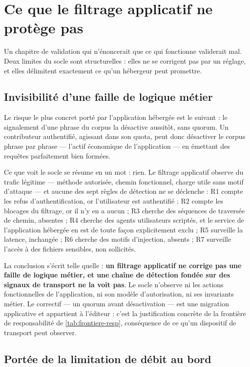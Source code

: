 \section{Ce que le filtrage applicatif ne protège pas}
\label{sec:limites-filtrage}

Un chapitre de validation qui n'énoncerait que ce qui fonctionne validerait mal. Deux limites du
socle sont structurelles : elles ne se corrigent pas par un réglage, et elles délimitent exactement
ce qu'un hébergeur peut promettre.

\subsection{Invisibilité d'une faille de logique métier}

Le risque le plus concret porté par l'application hébergée est le suivant : le signalement d'une
phrase du corpus la désactive aussitôt, sans quorum. Un contributeur authentifié, agissant dans
son quota, peut donc désactiver le corpus phrase par phrase --- l'actif économique de
l'application --- en émettant des requêtes parfaitement bien formées.

Ce que voit le socle se résume en un mot : rien. Le filtrage applicatif observe du trafic
légitime --- méthode autorisée, chemin fonctionnel, charge utile sans motif d'attaque --- et aucune
des sept règles de détection ne se déclenche : R1 compte les refus d'authentification, or l'utilisateur est
authentifié ; R2 compte les blocages du filtrage, or il n'y en a aucun ; R3 cherche des séquences
de traversée de chemin, absentes ; R4 cherche des agents utilisateurs scriptés, et le service de
l'application hébergée en est de toute façon explicitement exclu ; R5 surveille la latence,
inchangée ; R6 cherche des motifs d'injection, absents ; R7 surveille l'accès à des fichiers
sensibles, non sollicités.

La conclusion s'écrit telle quelle : \textbf{un filtrage applicatif ne corrige pas une faille de
logique métier, et une chaîne de détection fondée sur des signaux de transport ne la voit pas}. Le
socle n'observe ni les actions fonctionnelles de l'application, ni son modèle d'autorisation, ni
ses invariants métier. Le correctif --- un quorum avant désactivation --- est une migration
applicative et appartient à l'éditeur : c'est la justification concrète de la frontière de
responsabilité de \cref{tab:frontiere-resp}, conséquence de ce qu'un dispositif de transport peut
observer.

\subsection{Portée de la limitation de débit au bord}

